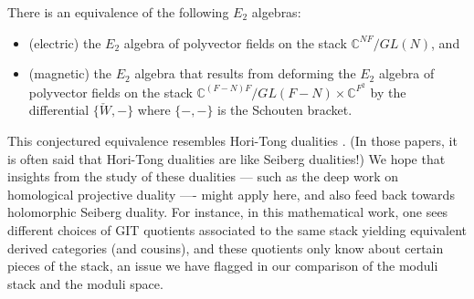\documentclass[11pt]{amsart}
\def\C{{\mathbb{C}}}
\begin{document}
\begin{conj}
There is an equivalence of the following $E_2$ algebras:
\begin{itemize} 
\item (electric) the $E_2$ algebra of polyvector fields on the stack $\C^{NF} / GL(N)$, and 
\item (magnetic) the $E_2$ algebra that results from deforming the $E_2$ algebra of polyvector fields on the stack $\C^{(F-N)F} / GL(F-N) \times \C^{F^2}$ by the differential $\{\check{W},-\}$ where $\{-,-\}$ is the Schouten bracket.
\end{itemize}
\end{conj}


This conjectured equivalence resembles Hori-Tong dualities \cite{HoriTong, Hori, others}.
(In those papers, it is often said that Hori-Tong dualities are like Seiberg dualities!)
We hope that insights from the study of these dualities --- such as the deep work on homological projective duality \cite{Kuznetsov, Thomas, Segal, others} ---- might apply here, and also feed back towards holomorphic Seiberg duality.
For instance, in this mathematical work, 
one sees different choices of GIT quotients associated to the same stack yielding equivalent derived categories (and cousins),
and these quotients only know about certain pieces of the stack,
an issue we have flagged in our comparison of the moduli stack and the moduli space.
\end{document}
